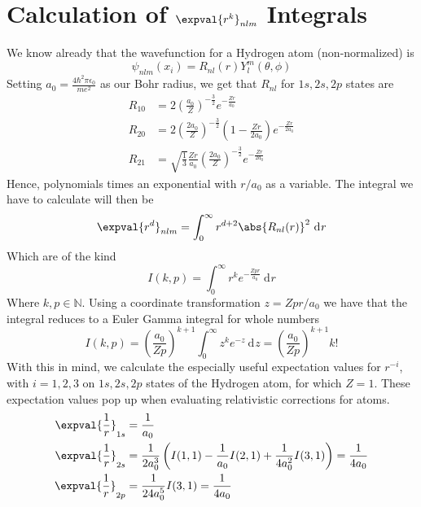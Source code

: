 \documentclass[a4paper, 11pt]{book}
\newcommand{\1}{\opr{\mathds{1}}}
\newcommand{\diff}[2][]{\ \mathrm{d}^{#1}#2}
\theoremstyle{plain}
\begin{document}
	\chapter{Calculation of $\expval{r^k}_{nlm}$ Integrals}\label{app:E}
	We know already that the wavefunction for a Hydrogen atom (non-normalized) is
	\begin{equation}
		\psi_{nlm}(x_i)=R_{nl}(r)Y^m_l(\theta,\phi)
		\label{eq:hydrogenwavefunctionappendix}
	\end{equation}
	Setting $a_0=\frac{4\hbar^2\pi\epsilon_0}{me^2}$ as our Bohr radius, we get that $R_{nl}$ for $1s,2s,2p$ states are
	\begin{equation}
		\begin{aligned}
			R_{10}&=2\left( \frac{a_0}{Z} \right)^{-\frac{3}{2}}e^{-\frac{Zr}{a_0}}\\
			R_{20}&=2\left( \frac{2a_0}{Z} \right)^{-\frac{3}{2}}\left( 1-\frac{Zr}{2a_0} \right)e^{-\frac{Zr}{2a_0}}\\
			R_{21}&=\sqrt{\frac{1}{3}}\frac{Zr}{a_0}\left( \frac{2a_0}{Z} \right)^{-\frac{3}{2}}e^{-\frac{Zr}{2a_0}}
		\end{aligned}
		\label{eq:rnlappendix}
	\end{equation}
	Hence, polynomials times an exponential with $r/a_0$ as a variable. The integral we have to calculate will then be
	\begin{equation}
		\expval{r^d}_{nlm}=\int_{0}^{\infty}r^{d+2}\abs{R_{nl}(r)}^2\diff{r}
		\label{eq:completeintegralrdapp}
	\end{equation}
	Which are of the kind
	\begin{equation}
		I(k,p)=\int_{0}^{\infty}r^ke^{-\frac{Zpr}{a_0}}\diff{r}
		\label{eq:integralstocalculate}
	\end{equation}
	Where $k,p\in\mathbb{N}$. Using a coordinate transformation $z=Zpr/a_0$ we have that the integral reduces to a Euler Gamma integral for whole numbers
	\begin{equation}
		I(k,p)=\left( \frac{a_0}{Zp} \right)^{k+1}\int_{0}^{\infty}z^ke^{-z}\diff{z}=\left( \frac{a_0}{Zp} \right)^{k+1}k!
		\label{eq:integralssolved}
	\end{equation}
	With this in mind, we calculate the especially useful expectation values for $r^{-i}$, with $i=1,2,3$ on $1s,2s,2p$ states of the Hydrogen atom, for which $Z=1$. These expectation values pop up when evaluating relativistic corrections for atoms.
	\begin{equation}
		\begin{aligned}
			\expval{\frac{1}{r}}_{1s}&=\frac{1}{a_0}\\
			\expval{\frac{1}{r}}_{2s}&=\frac{1}{2a_0^3}\left( I(1,1)-\frac{1}{a_0}I(2,1)+\frac{1}{4a_0^2}I(3,1) \right)=\frac{1}{4a_0}\\
			\expval{\frac{1}{r}}_{2p}&=\frac{1}{24a_0^5}I(3,1)=\frac{1}{4a_0}
		\end{aligned}
		\label{eq:rminusoneapp}
	\end{equation}
\end{document}
